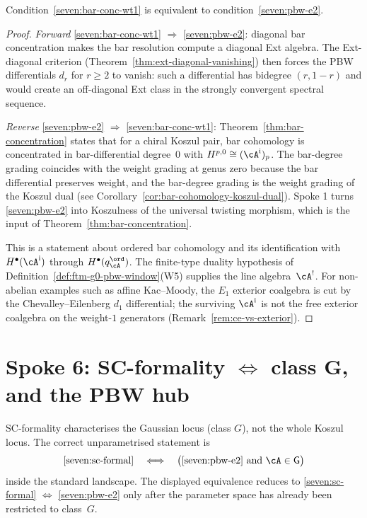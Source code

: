 \begin{proposition}
\label{prop:ftm-spoke-bar-conc-pbw}
Condition~\ref{seven:bar-conc-wt1} is equivalent to
condition~\ref{seven:pbw-e2}.
\end{proposition}

\begin{proof}
\emph{Forward} \ref{seven:bar-conc-wt1} $\Rightarrow$
\ref{seven:pbw-e2}: diagonal bar concentration makes the bar
resolution compute a diagonal Ext algebra.  The
Ext-diagonal criterion
(Theorem~\ref{thm:ext-diagonal-vanishing}) then forces the PBW
differentials $d_r$ for $r \geq 2$ to vanish: such a differential
has bidegree $(r,1-r)$ and would create an off-diagonal Ext class in
the strongly convergent spectral sequence.

\emph{Reverse} \ref{seven:pbw-e2} $\Rightarrow$
\ref{seven:bar-conc-wt1}: Theorem~\ref{thm:bar-concentration} states
that for a chiral Koszul pair, bar cohomology is concentrated in
bar-differential degree~$0$ with
$H^{p,0}\cong(\cA^{\mathrm i})_p$. The
bar-degree grading coincides with the weight grading at genus zero
because the bar differential preserves weight, and the bar-degree
grading is the weight grading of the Koszul dual (see
Corollary~\ref{cor:bar-cohomology-koszul-dual}). Spoke 1 turns
\ref{seven:pbw-e2} into Koszulness of the universal twisting morphism,
which is the input of Theorem~\ref{thm:bar-concentration}.

This is a statement about ordered bar cohomology and its identification
with $H^\bullet(\cA^{\mathrm i})$ through
$H^\bullet(q_\cA^{\ord})$.  The finite-type duality hypothesis of
Definition~\ref{def:ftm-g0-pbw-window}\textup{(W5)} supplies the
line algebra~$\cA^!$.  For non-abelian examples such as affine Kac--Moody,
the $E_1$ exterior coalgebra is cut by the Chevalley--Eilenberg
$d_1$ differential; the surviving $\cA^{\mathrm i}$ is not the free
exterior coalgebra on the weight-$1$ generators
\textup{(}Remark~\ref{rem:ce-vs-exterior}\textup{)}.
\end{proof}

\section{Spoke 6: SC-formality
\texorpdfstring{$\Leftrightarrow$}{iff} class G, and the PBW hub}
\label{sec:ftm-spoke-6}

SC-formality characterises the Gaussian locus (class $G$), not the
whole Koszul locus.  The correct unparametrised statement is
\[
\ref{seven:sc-formal}
\quad\Longleftrightarrow\quad
\bigl(\ref{seven:pbw-e2}\ \text{and}\ \cA\in\mathsf{G}\bigr)
\]
inside the standard landscape.  The displayed equivalence reduces to
\ref{seven:sc-formal} $\Leftrightarrow$ \ref{seven:pbw-e2} only after
the parameter space has already been restricted to class~$G$.

